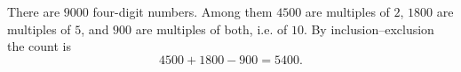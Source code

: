 There are $9000$ four-digit numbers. Among them $4500$ are multiples of $2$, $1800$ are multiples of $5$, and $900$ are multiples of both, i.e. of $10$. By inclusion--exclusion the count is
\[
4500+1800-900=\boxed{5400}.
\]
